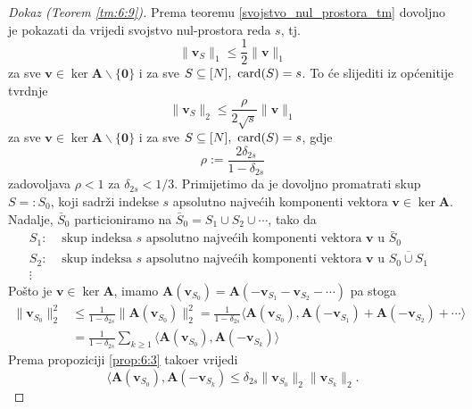 \documentclass[a4paper,twoside,12pt]{memoir} %
\newcommand{\vect}[1]{\mathbf{#1}}
\renewcommand{\vec}{\vect}
\newcommand{\card}{\text{\normalfont{card}}}
\newcommand{\norm}[1]{\|{#1}\|}
\begin{document}
\begin{proof}[Dokaz (Teorem \ref{tm:6:9})]
    Prema teoremu \ref{svojstvo_nul_prostora_tm} dovoljno je pokazati da vrijedi svojstvo nul-prostora reda $s$, tj.
    \begin{equation*}
        \norm{\vec v_S}_1 \leq \frac{1}{2} \norm{\vec v}_1     
    \end{equation*}
    za sve $\vec v \in \ker \vec A \backslash \{\vec 0\}$ i za sve $S \subseteq [N],\  \card(S) = s$. To \'ce slijediti iz op\'cenitije tvrdnje  
    \begin{equation*}
        \norm{\vec v_S}_2 \leq \frac{\rho}{2 \sqrt{s}} \norm{\vec v}_1     
    \end{equation*}
    za sve $\vec v \in \ker \vec A \backslash \{\vec 0\}$ i za sve $S \subseteq [N],\  \card(S) = s$, gdje
    \begin{equation*}
        \rho := \frac{2 \delta_{2s}}{1 - \delta_{2s}}  
    \end{equation*}
    zadovoljava $\rho < 1$ za $\delta_{2s} < 1/3$.
    Primijetimo da je dovoljno promatrati skup $S =: S_0$, koji sadr\v{z}i indekse $s$ apsolutno najve\'cih komponenti vektora $\vec v \in \ker \vec A$. Nadalje, $\bar S_0$ particioniramo na $\bar S_0 = S_1 \cup S_2 \cup \cdots$, tako da
    \begin{align*}
       S_1:& \text{ skup indeksa $s$ apsolutno najve\'cih komponenti vektora $\vec v$ u $\bar S_0$}\\ 
       S_2:& \text{ skup indeksa $s$ apsolutno najve\'cih komponenti vektora $\vec v$ u $\overline{S_0 \cup S_1}$ }\\
       \vdots &
    \end{align*}
    Po\v{s}to je $\vec v \in \ker \vec A$, imamo $\vec A(\vec v_{S_0}) = \vec A(-\vec v_{S_1} - \vec v_{S_2} - \cdots)$ pa stoga
    \begin{align}
        \norm{\vec v_{S_0}}^2_2 &\leq \frac{1}{1- \delta_{2s}} \norm{\vec A(\vec v_{S_0})}^2_2 = \frac{1}{1-\delta_{2s}} \langle \vec A(\vec v_{S_0}), \vec A(-\vec v_{S_1}) + \vec A (- \vec v_{S_2}) + \cdots \rangle \nonumber \\
        &= \frac{1}{1-\delta_{2s}} \sum_{k \geq 1} \langle \vec A(\vec v_{S_0}), \vec A (- \vec v_{S_k}) \rangle \label{6:18}
    \end{align}
    Prema propoziciji \ref{prop:6:3} tako\dj er vrijedi
    \begin{equation}\label{6:19}
        \langle \vec A (\vec v_{S_0}), \vec A (-\vec v_{S_k})  \leq \delta_{2s} \norm{\vec v_{S_0}}_2 \norm{\vec v_{S_k}}_2.

\end{equation}
\end{proof}
\end{document}
